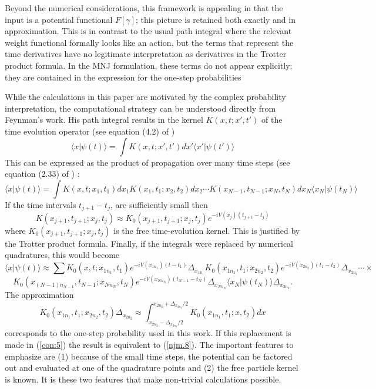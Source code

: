 \documentclass[aps,prc,reprint,noshowpacs,groupedaddress,onecolumn]{revtex4}
\def\beq{\begin{equation}}
\def\eeq{\end{equation}}
\begin{document}
Beyond the numerical considerations, this framework is appealing in
that the input is a potential functional $F[\gamma]$; this picture 
is retained both exactly and in approximation.   This is in contrast to the 
usual path integral where the relevant weight functional formally 
looks like an action, but the terms that represent the time derivatives
have no legitimate interpretation as derivatives in the Trotter
product formula.  In the MNJ formulation, these terms do not appear 
explicitly; they are contained in the expression for the 
one-step probabilities

While the calculations in this paper are motivated by the 
complex probability interpretation, the computational strategy 
can be understood directly from Feynman's work.  His path integral 
results in the kernel $K(x,t;x',t')$ of the
time evolution operator (see equation (4.2) of \cite{Feynman_2})
\beq
\langle x \vert \psi (t) \rangle = \int K(x,t;x',t') dx' 
\langle x' \vert \psi (t') \rangle
\label{con:2}
\eeq
This can be expressed as the product of propagation over many 
time steps (see equation
(2.33) of \cite{Feynman_2}) :
\beq
\langle x \vert \psi (t) \rangle = \int K(x,t;x_1,t_1) dx_1
K(x_1,t_1;x_2,t_2) dx_2 \cdots K(x_{N-1},t_{N-1};x_N,t_N) dx_N 
\langle x_N \vert \psi (t_N) \rangle
\label{con:3}
\eeq
If the time intervals $t_{j+1}-t_j$, are sufficiently small then   
\beq
K(x_{j+1},t_{j+1};x_j,t_j) \approx
K_0(x_{j+1},t_{j+1};x_j,t_j)e^{-i V(x_j)(t_{j+1}-t_j)} 
\label{con:4}
\eeq 
where $K_0(x_{j+1},t_{j+1};x_j,t_j)$ is the free time-evolution 
kernel.  This is justified by the Trotter product formula.
Finally, if the integrals were replaced by numerical quadratures,
this would become
\[
\langle x \vert \psi (t) \rangle \approx \sum 
K_0(x,t ;x_{1n_1} ,t_1)e^{-i V(x_{1n_1})(t-t_1)} \Delta_{x_{1n_1}}
K_0(x_{1n_1},t_1 ;x_{2n_2} ,t_2)e^{-i V(x_{2n_2})(t_1-t_2)} \Delta_{x_{2n_2}}
\cdots \times
\]
\beq
K_0(x_{(N-1)n_{N-1}},t_{N-1} ;x_{Nn_N} ,t_N)e^{-i V(x_{Nn_N})(t_{N-1} -t_N)} \Delta_{x_{Nn_N}} \langle x_N \vert \psi (t_N) \rangle
\Delta_{x_{2n_2}}.
\label{con:5}
\eeq
The approximation
\beq
K_0(x_{1n_1},t_1 ;x_{2n_2} ,t_2)\Delta_{x_{2n_2}}
\approx 
\int_{x_{2n_2}-\Delta_{x_{2n_2}}/2}^{x_{2n_2}+\Delta_{x_{2n_2}}/2}
K_0(x_{1n_1},t_1 ;x ,t_2)dx
\label{con:6}
\eeq
corresponds to  the one-step probability  used in this work.   If this
replacement  is made  in  (\ref{con:5}) the  result  is equivalent  to
(\ref{njm.8}).  The important features to emphasize are (1) because of
the small time steps, the potential can be factored out and evaluated
at one of the quadrature points  and (2) the free  particle kernel is
known.  It is these two features that make  non-trivial calculations
possible.
\end{document}
